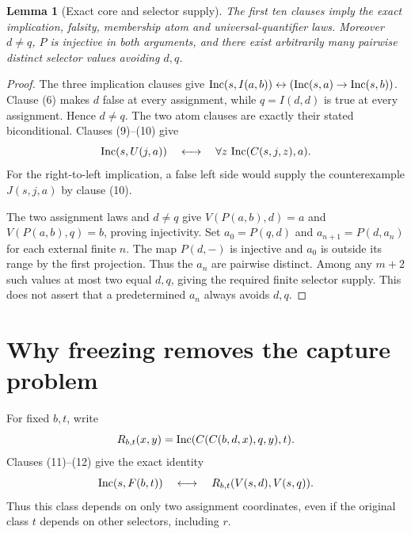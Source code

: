 \documentclass[11pt]{article}
\newtheorem{lemma}[theorem]{Lemma}
\newcommand{\Inc}{\mathop{\rm Inc}}
\begin{document}
\begin{lemma}[Exact core and selector supply]
The first ten clauses imply the exact implication, falsity, membership
atom and universal-quantifier laws.  Moreover $d\ne q$, $P$ is injective
in both arguments, and there exist arbitrarily many pairwise distinct
selector values avoiding $d,q$.
\end{lemma}
\begin{proof}
The three implication clauses give
$\Inc(s,I(a,b))\leftrightarrow(\Inc(s,a)\to\Inc(s,b))$.
Clause (6) makes $d$ false at every assignment, while $q=I(d,d)$ is true
at every assignment.  Hence $d\ne q$.  The two atom clauses are exactly
their stated biconditional.  Clauses (9)--(10) give
\[
 \Inc(s,U(j,a))\quad\longleftrightarrow\quad
 \forall z\,\Inc(C(s,j,z),a).
\]
For the right-to-left implication, a false left side would supply the
counterexample $J(s,j,a)$ by clause (10).

The two assignment laws and $d\ne q$ give
$V(P(a,b),d)=a$ and $V(P(a,b),q)=b$, proving injectivity.
Set $a_0=P(q,d)$ and $a_{n+1}=P(d,a_n)$ for each external finite $n$.
The map $P(d,-)$ is injective and $a_0$ is outside its range by the first
projection.  Thus the $a_n$ are pairwise distinct.  Among any $m+2$ such
values at most two equal $d,q$, giving the required finite selector supply.
This does not assert that a predetermined $a_n$ always avoids $d,q$.
\end{proof}

\section{Why freezing removes the capture problem}

For fixed $b,t$, write
\[
 R_{b,t}(x,y)=\Inc(C(C(b,d,x),q,y),t).
\]
Clauses (11)--(12) give the exact identity
\[
 \Inc(s,F(b,t))\quad\longleftrightarrow\quad
 R_{b,t}(V(s,d),V(s,q)).
\]
Thus this class depends on only two assignment coordinates, even if the
original class $t$ depends on other selectors, including $r$.
\end{document}
